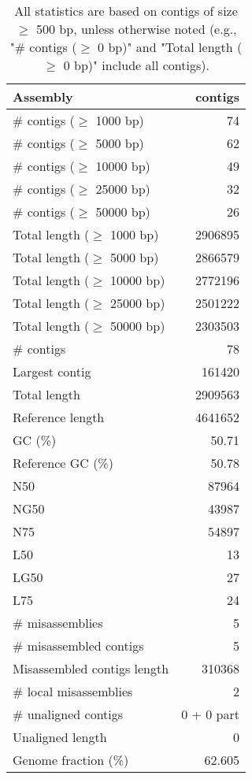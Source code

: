 \documentclass[12pt,a4paper]{article}
\begin{document}
\begin{table}[ht]
\begin{center}
\caption{All statistics are based on contigs of size $\geq$ 500 bp, unless otherwise noted (e.g., "\# contigs ($\geq$ 0 bp)" and "Total length ($\geq$ 0 bp)" include all contigs).}
\begin{tabular}{|l*{1}{|r}|}
\hline
Assembly & contigs \\ \hline
\# contigs ($\geq$ 1000 bp) & 74 \\ \hline
\# contigs ($\geq$ 5000 bp) & 62 \\ \hline
\# contigs ($\geq$ 10000 bp) & 49 \\ \hline
\# contigs ($\geq$ 25000 bp) & 32 \\ \hline
\# contigs ($\geq$ 50000 bp) & 26 \\ \hline
Total length ($\geq$ 1000 bp) & 2906895 \\ \hline
Total length ($\geq$ 5000 bp) & 2866579 \\ \hline
Total length ($\geq$ 10000 bp) & 2772196 \\ \hline
Total length ($\geq$ 25000 bp) & 2501222 \\ \hline
Total length ($\geq$ 50000 bp) & 2303503 \\ \hline
\# contigs & 78 \\ \hline
Largest contig & 161420 \\ \hline
Total length & 2909563 \\ \hline
Reference length & 4641652 \\ \hline
GC (\%) & 50.71 \\ \hline
Reference GC (\%) & 50.78 \\ \hline
N50 & 87964 \\ \hline
NG50 & 43987 \\ \hline
N75 & 54897 \\ \hline
L50 & 13 \\ \hline
LG50 & 27 \\ \hline
L75 & 24 \\ \hline
\# misassemblies & 5 \\ \hline
\# misassembled contigs & 5 \\ \hline
Misassembled contigs length & 310368 \\ \hline
\# local misassemblies & 2 \\ \hline
\# unaligned contigs & 0 + 0 part \\ \hline
Unaligned length & 0 \\ \hline
Genome fraction (\%) & 62.605 \\ \hline

\end{tabular}
\end{center}
\end{table}
\end{document}
